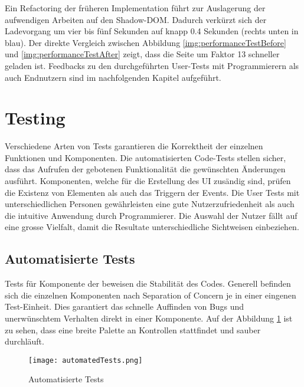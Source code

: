 Ein Refactoring der früheren Implementation führt zur Auslagerung der aufwendigen Arbeiten auf den Shadow-DOM. 
Dadurch verkürzt sich der Ladevorgang um vier bis fünf Sekunden auf knapp 0.4 Sekunden (rechts unten in blau). 
Der direkte Vergleich zwischen Abbildung \ref{img:performanceTestBefore} und \ref{img:performanceTestAfter} zeigt, dass die Seite um Faktor 13 schneller geladen ist. 
Feedbacks zu den durchgeführten User-Tests mit Programmierern als auch Endnutzern sind im nachfolgenden Kapitel aufgeführt. 


\section{Testing}
\label{sec:testing}

Verschiedene Arten von Tests garantieren die Korrektheit der einzelnen Funktionen und Komponenten. 
Die automatisierten Code-Tests stellen sicher, dass das Aufrufen der gebotenen Funktionalität die gewünschten Änderungen ausführt. 
Komponenten, welche für die Erstellung des UI zusändig sind, prüfen die Existenz von Elementen als auch das Triggern der Events. 
Die User Tests mit unterschiedlichen Personen gewährleisten eine gute Nutzerzufriedenheit als auch die intuitive Anwendung durch Programmierer. 
Die Auswahl der Nutzer fällt auf eine grosse Vielfalt, damit die Resultate unterschiedliche Sichtweisen einbeziehen. 


\subsection{Automatisierte Tests}
\label{sec:automatedTests}

Tests für Komponente der  beweisen die Stabilität des Codes. 
Generell befinden sich die einzelnen Komponenten nach Separation of Concern je in einer eingenen Test-Einheit. 
Dies garantiert das schnelle Auffinden von Bugs und unerwünschtem Verhalten direkt in einer Komponente. 
Auf der Abbildung \ref{img:automatedTests} ist zu sehen, dass eine breite Palette an Kontrollen stattfindet und sauber durchläuft. 

\begin{figure}[!htb]
    \centering
    \texttt{[image: automatedTests.png]}
    \caption{\centering Automatisierte Tests}
    \label{img:automatedTests}
\end{figure}

